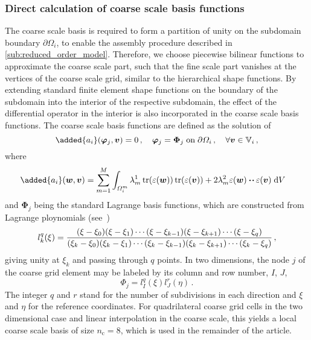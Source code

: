 \documentclass[AMA,STIX1COL,doublespace]{WileyNJD-v2}
\begin{document}
\subsubsection{Direct calculation of coarse scale basis functions}%
\label{ssub:coarse_scale_basis}
The coarse scale basis is required to form a partition of unity on the
subdomain boundary $\partial\varOmega_i$, to enable the assembly procedure
described in \cref{sub:reduced_order_model}.
Therefore, we choose piecewise bilinear functions to approximate the coarse scale part,
such that the fine scale part vanishes at the vertices of the coarse scale grid,
similar to the hierarchical shape functions.
By extending standard finite element shape functions on the boundary
of the subdomain into the interior of the respective subdomain,
the effect of the differential operator in the interior is also incorporated
in the coarse scale basis functions.
The coarse scale basis functions are defined as the solution of
\begin{equation}
	\label{eq:coarse_basis_form}
    \added{a_i}(\bm{\varphi}_j, \bm{v}) = 0\,,\quad \bm{\varphi}_j = \bm{\Phi}_j\;\mathrm{on}\;\partial\varOmega_i\,,\quad\forall\bm{v}\in\mathbb{V}_i\,,
\end{equation}
where
\begin{align}
	\label{eq:a_rce}
    \added{a_i}(\bm{w}, \bm{v}) &= \sum_{m=1}^M \int_{\varOmega^m_i} 
    \lambda^1_m \tr(\varepsilon(\bm{w})) \tr(\varepsilon(\bm{v})) + 
    2\lambda^2_m \varepsilon(\bm{w}) \vdot\!\vdot\, \varepsilon(\bm{v}) \; \dd V
\end{align}
and $\bm{\Phi}_j$ being the standard Lagrange basis functions, which are constructed from Lagrange ploynomials (see~\cite{ZienkiewiczTaylor2000})
\begin{equation}
	{l}^{q}_{k}(\xi)=\frac{%
		(\xi-{\xi}_{0})(\xi-{\xi}_{1})\cdots(\xi-{\xi}_{k-1})(\xi-{\xi}_{k+1})\cdots(\xi-{\xi}_{q})
	}{%
	({\xi}_{k}-{\xi}_{0})({\xi}_{k}-{\xi}_{1})\cdots({\xi}_{k}-{\xi}_{k-1})({\xi}_{k}-{\xi}_{k+1})\cdots({\xi}_{k}-{\xi}_{q})
}\,,
\end{equation}
giving unity at ${\xi}_{k}$ and passing through $q$ points.
In two dimensions, the node $j$ of the coarse grid element may be labeled by its column and row number, $I$, $J$,
\begin{equation}
	{\Phi}_{j}={l}^{q}_{I}(\xi){l}^{r}_{J}(\eta)\,.
\end{equation}
The integer $q$ and $r$ stand for the number of subdivisions in each direction and $\xi$ and $\eta$ for the reference coordinates.
For quadrilateral coarse grid cells in the two dimensional case and linear interpolation
in the coarse scale, this yields a local coarse scale basis of size $n_{\mathrm{c}}=8$,
which is used in the remainder of the article.
\end{document}
